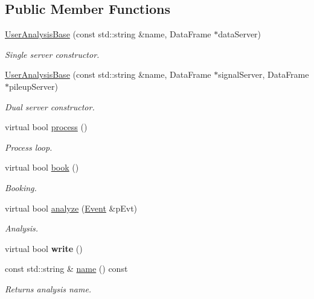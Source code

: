 \subsection*{Public Member Functions}
\begin{CompactItemize}
\item 
\hyperlink{classUserAnalysisBase_3cc225ef8241f14310873e72d9960078}{User\-Analysis\-Base} (const std::string \&name, Data\-Frame $\ast$data\-Server)
\begin{CompactList}\small\item\em Single server constructor. \item\end{CompactList}\item 
\hyperlink{classUserAnalysisBase_e1e2ecf9f0a86b33e6ce10e1323763dd}{User\-Analysis\-Base} (const std::string \&name, Data\-Frame $\ast$signal\-Server, Data\-Frame $\ast$pileup\-Server)
\begin{CompactList}\small\item\em Dual server constructor. \item\end{CompactList}\item 
virtual bool \hyperlink{classUserAnalysisBase_b854df840f749f7f9dd5bb2ca9447c25}{process} ()
\begin{CompactList}\small\item\em Process loop. \item\end{CompactList}\item 
virtual bool \hyperlink{classUserAnalysisBase_4ed3754992929a1aeb1e938b31ec22af}{book} ()
\begin{CompactList}\small\item\em Booking. \item\end{CompactList}\item 
virtual bool \hyperlink{classUserAnalysisBase_015733b03dfc2596dfaf1841ca60a0b8}{analyze} (\hyperlink{classEvent}{Event} \&p\-Evt)
\begin{CompactList}\small\item\em Analysis. \item\end{CompactList}\item 
\hypertarget{classUserAnalysisBase_bff532e71b9947d7d64776c80b211840}{
virtual bool \textbf{write} ()}
\label{classUserAnalysisBase_bff532e71b9947d7d64776c80b211840}

\item 
\hypertarget{classUserAnalysisBase_935a0f2057e8b1f8c742d4cf3bd9dbc8}{
const std::string \& \hyperlink{classUserAnalysisBase_935a0f2057e8b1f8c742d4cf3bd9dbc8}{name} () const }
\label{classUserAnalysisBase_935a0f2057e8b1f8c742d4cf3bd9dbc8}

\begin{CompactList}\small\item\em Returns analysis name. \item\end{CompactList}\end{CompactItemize}
